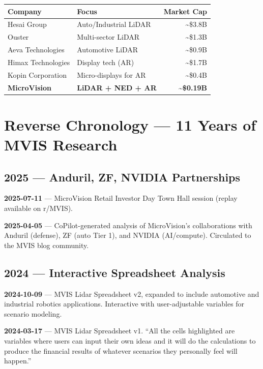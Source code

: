 \documentclass[11pt,letterpaper]{article}
\begin{document}
\begin{center}
\begin{tabular}{@{}llr@{}}
\toprule
\textbf{Company} & \textbf{Focus} & \textbf{Market Cap} \\
\midrule
Hesai Group & Auto/Industrial LiDAR & \textasciitilde\$3.8B \\
Ouster & Multi-sector LiDAR & \textasciitilde\$1.3B \\
Aeva Technologies & Automotive LiDAR & \textasciitilde\$0.9B \\
Himax Technologies & Display tech (AR) & \textasciitilde\$1.7B \\
Kopin Corporation & Micro-displays for AR & \textasciitilde\$0.4B \\
\textbf{MicroVision} & \textbf{LiDAR + NED + AR} & \textbf{\textasciitilde\$0.19B} \\
\bottomrule
\end{tabular}
\end{center}

\section{Reverse Chronology --- 11 Years of MVIS Research}

\subsection*{2025 --- Anduril, ZF, NVIDIA Partnerships}

{\color{datecyan}\textbf{2025-07-11}} --- MicroVision Retail Investor Day Town Hall session (replay available on r/MVIS).

{\color{datecyan}\textbf{2025-04-05}} --- CoPilot-generated analysis of MicroVision's collaborations with Anduril (defense), ZF (auto Tier 1), and NVIDIA (AI/compute). Circulated to the MVIS blog community.

\subsection*{2024 --- Interactive Spreadsheet Analysis}

{\color{datecyan}\textbf{2024-10-09}} --- MVIS Lidar Spreadsheet v2, expanded to include automotive and industrial robotics applications. Interactive with user-adjustable variables for scenario modeling.

{\color{datecyan}\textbf{2024-03-17}} --- MVIS Lidar Spreadsheet v1. ``All the cells highlighted are variables where users can input their own ideas and it will do the calculations to produce the financial results of whatever scenarios they personally feel will happen.''
\end{document}
